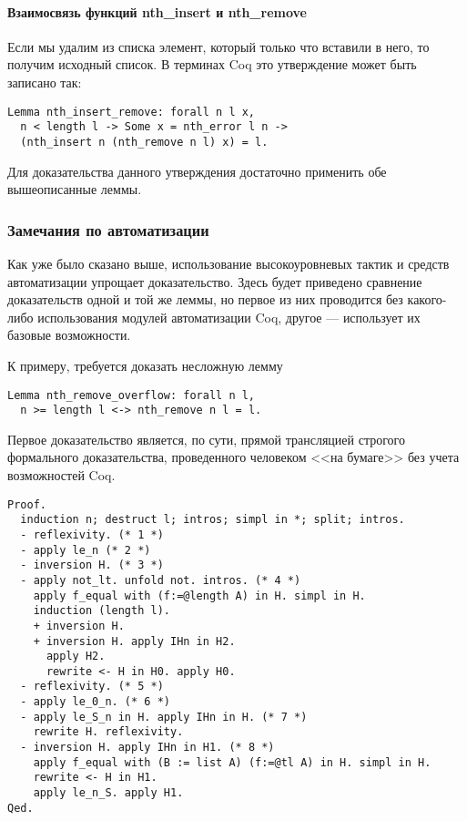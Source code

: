 \paragraph{Взаимосвязь функций nth\_insert и nth\_remove} Если мы удалим из списка элемент, который только что вставили в него, то получим исходный список. В терминах Coq это утверждение может быть записано так:
\begin{Verbatim}[fontsize=\small]
Lemma nth_insert_remove: forall n l x,
  n < length l -> Some x = nth_error l n ->
  (nth_insert n (nth_remove n l) x) = l.
\end{Verbatim}

Для доказательства данного утверждения достаточно применить обе вышеописанные леммы.

\subsubsection{Замечания по автоматизации}

Как уже было сказано выше, использование высокоуровневых тактик и средств автоматизации упрощает доказательство. Здесь будет приведено сравнение доказательств одной и той же леммы, но первое из них проводится без какого-либо использования модулей автоматизации Coq, другое --- использует их базовые возможности.

К примеру, требуется доказать несложную лемму
\begin{Verbatim}[fontsize=\small]
Lemma nth_remove_overflow: forall n l,
  n >= length l <-> nth_remove n l = l.
\end{Verbatim}

Первое доказательство является, по сути, прямой трансляцией строгого формального доказательства, проведенного человеком <<на бумаге>> без учета возможностей Coq.
\begin{Verbatim}[fontsize=\small]
Proof.
  induction n; destruct l; intros; simpl in *; split; intros.
  - reflexivity. (* 1 *)
  - apply le_n (* 2 *)
  - inversion H. (* 3 *)
  - apply not_lt. unfold not. intros. (* 4 *)
    apply f_equal with (f:=@length A) in H. simpl in H.
    induction (length l).
    + inversion H.
    + inversion H. apply IHn in H2.
      apply H2.
      rewrite <- H in H0. apply H0.
  - reflexivity. (* 5 *)
  - apply le_0_n. (* 6 *)
  - apply le_S_n in H. apply IHn in H. (* 7 *)
    rewrite H. reflexivity.
  - inversion H. apply IHn in H1. (* 8 *)
    apply f_equal with (B := list A) (f:=@tl A) in H. simpl in H.
    rewrite <- H in H1.
    apply le_n_S. apply H1.
Qed.
\end{Verbatim}

